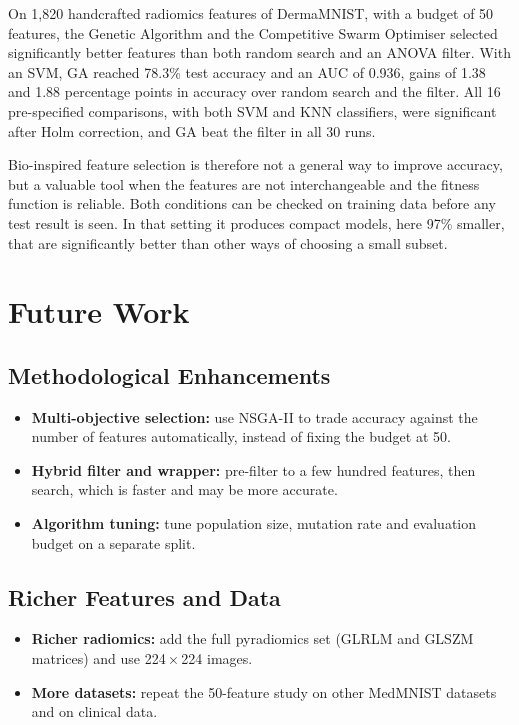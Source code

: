 \documentclass[12pt,a4paper]{report}
\begin{document}
On 1,820 handcrafted radiomics features of DermaMNIST, with a budget of 50 features, the Genetic Algorithm and the
Competitive Swarm Optimiser selected significantly better features than both random search and an ANOVA filter. With
an SVM, GA reached 78.3\% test accuracy and an AUC of 0.936, gains of 1.38 and 1.88 percentage points in accuracy
over random search and the filter. All 16 pre-specified comparisons, with both SVM and KNN classifiers, were
significant after Holm correction, and GA beat the filter in all 30 runs.

Bio-inspired feature selection is therefore not a general way to improve accuracy, but a valuable tool when the
features are not interchangeable and the fitness function is reliable. Both conditions can be checked on training
data before any test result is seen. In that setting it produces compact models, here 97\% smaller, that are
significantly better than other ways of choosing a small subset.

\chapter{Future Work}

\section{Methodological Enhancements}
\begin{itemize}
  \item \textbf{Multi-objective selection:} use NSGA-II to trade accuracy against the number of features
        automatically, instead of fixing the budget at 50.
  \item \textbf{Hybrid filter and wrapper:} pre-filter to a few hundred features, then search, which is faster and
        may be more accurate.
  \item \textbf{Algorithm tuning:} tune population size, mutation rate and evaluation budget on a separate split.
\end{itemize}

\section{Richer Features and Data}
\begin{itemize}
  \item \textbf{Richer radiomics:} add the full pyradiomics set (GLRLM and GLSZM matrices) and use
        224\,$\times$\,224 images.
  \item \textbf{More datasets:} repeat the 50-feature study on other MedMNIST datasets and on clinical data.
\end{itemize}
\end{document}
